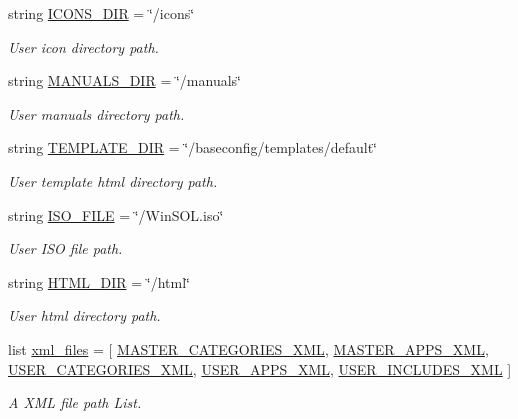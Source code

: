 \begin{CompactItemize}
string \hyperlink{namespacewinsol_cde697082cf908bfad7af04aae9ae3f7}{ICONS\_\-DIR} = \char`\"{}/icons\char`\"{}
\begin{CompactList}\small\item\em User icon directory path. \item\end{CompactList}\item 
string \hyperlink{namespacewinsol_ebc977350ca28d117f351ac77dbc9514}{MANUALS\_\-DIR} = \char`\"{}/manuals\char`\"{}
\begin{CompactList}\small\item\em User manuals directory path. \item\end{CompactList}\item 
string \hyperlink{namespacewinsol_8bc163ee74d98083104d5033c3262940}{TEMPLATE\_\-DIR} = \char`\"{}/baseconfig/templates/default\char`\"{}
\begin{CompactList}\small\item\em User template html directory path. \item\end{CompactList}\item 
string \hyperlink{namespacewinsol_3143fdfd6d34bd48ac2fec1e067af1df}{ISO\_\-FILE} = \char`\"{}/Win\-SOL.iso\char`\"{}
\begin{CompactList}\small\item\em User ISO file path. \item\end{CompactList}\item 
string \hyperlink{namespacewinsol_bbcde53c0ba69049711616caed5431b6}{HTML\_\-DIR} = \char`\"{}/html\char`\"{}
\begin{CompactList}\small\item\em User html directory path. \item\end{CompactList}\item 
list \hyperlink{namespacewinsol_e85bfaa286fd710182b7d906a514c2ea}{xml\_\-files} = \mbox{[} \hyperlink{namespacewinsol_3af9670786db792ef5991af5c3ae5793}{MASTER\_\-CATEGORIES\_\-XML}, \hyperlink{namespacewinsol_a0bf1d73390881ffdffdc95bee515f38}{MASTER\_\-APPS\_\-XML}, \hyperlink{namespacewinsol_329896e2d91a81d585750db3b5019e3a}{USER\_\-CATEGORIES\_\-XML}, \hyperlink{namespacewinsol_c33a1cb562b690cab5c72abf5dc6889a}{USER\_\-APPS\_\-XML}, \hyperlink{namespacewinsol_f5b54eec64d2e3ce6c6b15a1fbc615dd}{USER\_\-INCLUDES\_\-XML} \mbox{]}
\begin{CompactList}\small\item\em A XML file path List. \item\end{CompactList}\item 

\end{CompactItemize}
